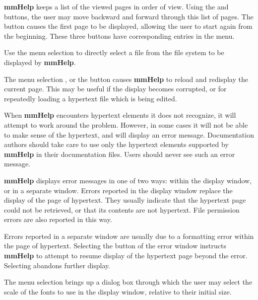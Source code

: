 {\bf mmHelp} keeps a list of the viewed pages in order of view.
Using the  and  buttons, 
the user may move backward and forward through 
this list of pages.
The  button causes the first page to be displayed, 
allowing the user to start again from the beginning.  These
three buttons have corresponding entries in the 
 menu.

Use the menu selection  to directly select
a file from the file system to be displayed by {\bf mmHelp}.

The menu selection , or 
the  button causes {\bf mmHelp} to reload and
redisplay the current
page.  This may be useful if the display becomes corrupted,
or for repeatedly loading a hypertext file which is being
edited.

When {\bf mmHelp} encounters hypertext elements it does not
recognize, it will attempt to work around the problem.  
However, in some cases it will not be able to make sense of 
the hypertext, and will display an error message.  Documentation
authors should take care to use only the hypertext elements
supported by {\bf mmHelp} in their documentation files.  Users
should never see such an error message.

{\bf mmHelp} displays error messages in one of two ways: 
within the display window, or in a separate window.  
Errors reported in the display window replace the display 
of the page of hypertext.
They usually indicate that the hypertext page could not be
retrieved, or that its contents are not hypertext.  File
permission errors are also reported in this way.

Errors reported in a separate window are usually due to a
formatting error within the page of hypertext.  Selecting the 
 button of the error window instructs {\bf mmHelp} to 
attempt to resume display of the hypertext page beyond the error.  
Selecting  abandons further display.  

The menu selection  brings up a
dialog box through which the user may select the scale of
the fonts to use in the display window, relative to their
initial size.


